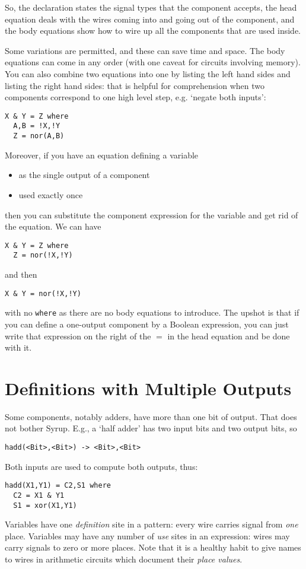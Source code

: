 \documentclass{article}
\begin{document}
So, the declaration states the signal types that the component
accepts, the head equation deals with the wires coming into and
going out of the component, and the body equations show how to
wire up all the components that are used inside.

Some variations are permitted, and these can save time and space.
The body equations can come in any order (with one caveat for
circuits involving memory). You can also combine two equations
into one by listing the left hand sides and listing the right hand
sides: that is helpful for comprehension when two components
correspond to one high level step, e.g. `negate both inputs':
\begin{verbatim}
X & Y = Z where
  A,B = !X,!Y
  Z = nor(A,B)
\end{verbatim}
Moreover, if you have an equation defining a variable
\begin{itemize}
\item as the single output of a component
\item used exactly once
\end{itemize}
then you can substitute the component expression for the
variable and get rid of the equation. We can have
\begin{verbatim}
X & Y = Z where
  Z = nor(!X,!Y)
\end{verbatim}
and then
\begin{verbatim}
X & Y = nor(!X,!Y)
\end{verbatim}
with no \verb!where! as there are no body equations to introduce.
The upshot is that if you can define a one-output component by
a Boolean expression, you can just write that expression on the
right of the $=$ in the head equation and be done with it.


\section{Definitions with Multiple Outputs}

Some components, notably adders, have more than one bit of output.
That does not bother Syrup. E.g., a `half adder' has two input
bits and two output bits, so
\begin{verbatim}
hadd(<Bit>,<Bit>) -> <Bit>,<Bit>
\end{verbatim}
Both inputs are used to compute both outputs, thus:
\begin{verbatim}
hadd(X1,Y1) = C2,S1 where
  C2 = X1 & Y1
  S1 = xor(X1,Y1)
\end{verbatim}
Variables have one \emph{definition} site in a pattern: every wire
carries signal from
\emph{one} place. Variables may have any number of \emph{use} sites in an
expression: wires may carry signals to zero or more places.
Note that it is a healthy habit to give names to wires in arithmetic
circuits which document their \emph{place values}.
\end{document}
